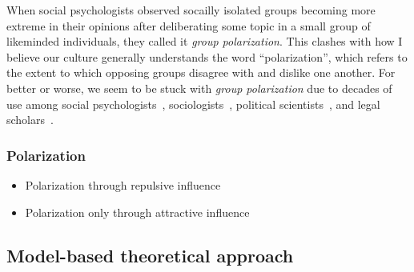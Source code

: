 \documentclass[12pt,letterpaper]{article}
\begin{document}
When social psychologists observed socailly isolated groups becoming more extreme
in their opinions after deliberating some topic in a small group of likeminded
individuals, they called it \emph{group polarization}. 
This clashes with how I believe our culture generally understands the word
``polarization'', which refers to the extent to which opposing groups disagree with
and dislike one another. For better or worse, we seem to be stuck with 
\emph{group polarization} due to decades of 
use among social psychologists~\cite{Brown1986,Sieber2019},
sociologists~\cite{Friedkin1999a}, political scientists~\cite{Schkade2010}, and legal scholars~\cite{Sunstein2002}.

\subsubsection{Polarization}

\begin{itemize}
  \item
    Polarization through repulsive influence~\cite{Baldassarri2007,Flache2011,Turner2018}
  \item
    Polarization only through attractive influence~\cite{Mas2013,Turner2020}
\end{itemize}


\subsection{Model-based theoretical approach}
\end{document}
